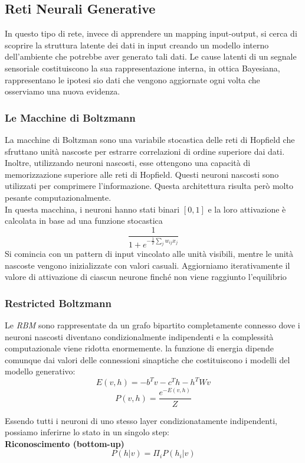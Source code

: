 \subsection{Reti Neurali Generative}
In questo tipo di rete, invece di apprendere un mapping input-output, si cerca di scoprire la struttura latente dei dati in input creando un modello interno dell'ambiente che potrebbe aver generato tali dati. Le cause latenti di un segnale sensoriale costituiscono la sua rappresentazione interna, in ottica Bayesiana, rappresentano le ipotesi sio dati che vengono aggiornate ogni volta che osserviamo una nuova evidenza.\\

\subsubsection{Le Macchine di Boltzmann}
La macchine di Boltzman sono una variabile stocastica delle reti di Hopfield che sfruttano unità nascoste per estrarre correlazioni di ordine superiore dai dati. Inoltre, utilizzando neuroni nascosti, esse ottengono una capacità di memorizzazione superiore alle reti di Hopfield. Questi neuroni nascosti sono utilizzati per comprimere l'informazione. Questa architettura risulta però molto pesante computazionalmente.
\\
In questa macchina, i neuroni hanno stati binari \([0, 1]\) e la loro attivazione è calcolata in base ad una funzione stocastica
\[\frac{1}{1+e^{-\frac{1}{T} \sum_j w_{ij}x_j}}\]
Si comincia con un pattern di input vincolato alle unità visibili, mentre le unità nascoste vengono inizializzate con valori casuali. Aggiorniamo iterativamente il valore di attivazione di ciascun neurone finché non viene raggiunto l'equilibrio

\subsubsection{Restricted Boltzmann}
Le \textit{RBM} sono rappresentate da un grafo bipartito completamente connesso dove i neuroni nascosti diventano condizionalmente indipendenti e la complessità computazionale viene ridotta enormemente. la funzione di energia dipende comunque dai valori delle connessioni sinaptiche che costituiscono i modelli del modello generativo:
\[E(v, h) = -b^Tv-c^Th-h^TWv\]
\[P(v, h) = \frac{e^{-E(v,h)}}{Z}\]

Essendo tutti i neuroni di uno stesso layer condizionatamente indipendenti, possiamo inferirne lo stato in un singolo step:\\
\textbf{Riconoscimento (bottom-up)}
\[P(h|v) = \Pi_i P(h_i|v)\]

